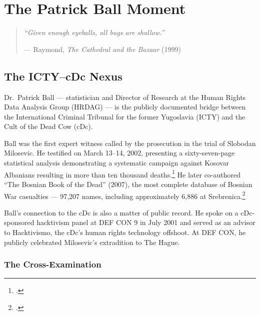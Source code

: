 
\chapter{The Patrick Ball Moment}
\label{pos19:patrick-ball}

\begin{quote}\small\textit{%
``Given enough eyeballs, all bugs are shallow.''%
}\par\raggedleft --- Raymond, \textit{The Cathedral and the Bazaar} (1999)\end{quote}

\vspace{0.5cm}



\section*{The ICTY--cDc Nexus}
\label{pos19:icty-cdc}

Dr.\ Patrick Ball --- statistician and Director of Research at the Human Rights Data Analysis Group (HRDAG) --- is the publicly documented bridge between the International Criminal Tribunal for the former Yugoslavia (ICTY) and the Cult of the Dead Cow (cDc).

Ball was the first expert witness called by the prosecution in the trial of Slobodan Milosevic. He testified on March 13--14, 2002, presenting a sixty-seven-page statistical analysis demonstrating a systematic campaign against Kosovar Albanians resulting in more than ten thousand deaths.\footcites{ballicty2002}{ictydecision} He later co-authored ``The Bosnian Book of the Dead'' (2007), the most complete database of Bosnian War casualties --- 97,207 names, including approximately 6,886 at Srebrenica.\footcite{foreignpolicy2012}

Ball's connection to the cDc is also a matter of public record. He spoke on a cDc-sponsored hacktivism panel at DEF CON 9 in July 2001 and served as an advisor to Hacktivismo, the cDc's human rights technology offshoot. At DEF CON, he publicly celebrated Milosevic's extradition to The Hague.

\subsection*{The Cross-Examination}
\label{pos19:cross-examination}

